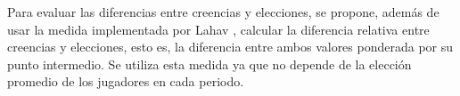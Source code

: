Para evaluar las diferencias entre creencias y elecciones, se propone, además de usar la medida implementada por Lahav \parencite*{Lahav2015}, calcular la diferencia relativa entre creencias y elecciones, esto es, la diferencia entre ambos valores ponderada por su punto intermedio. Se utiliza esta medida ya que no depende de la elección promedio de los jugadores en cada periodo.\\
